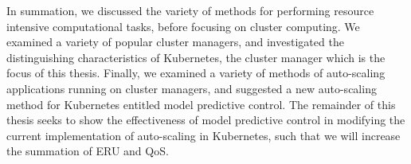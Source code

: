 In summation, we discussed the variety of methods for performing resource intensive
computational tasks, before focusing on cluster computing. We examined a variety
of popular cluster managers, and investigated the distinguishing characteristics
of Kubernetes, the cluster manager which is the focus of this thesis. Finally, we examined
a variety of methods of auto-scaling applications running on cluster managers,
and suggested a new auto-scaling method for Kubernetes entitled
model predictive control. The remainder of this thesis
seeks to show the effectiveness of model predictive control in modifying the
current implementation of auto-scaling in Kubernetes, such that we will increase
the summation of ERU and QoS.
